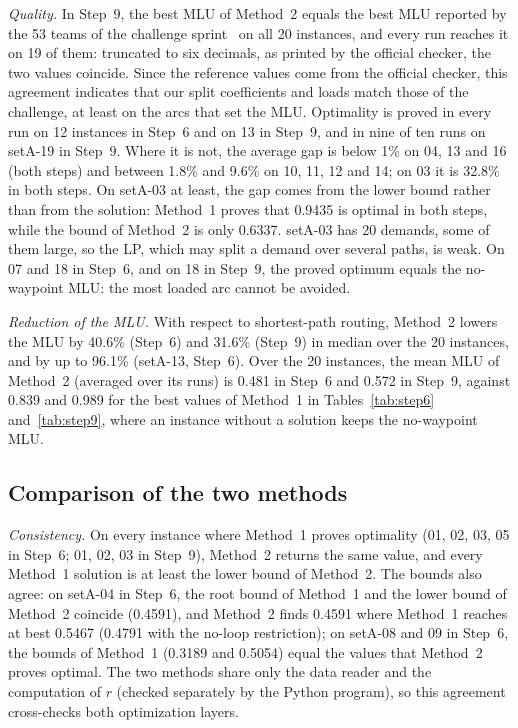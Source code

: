 \documentclass[conference]{IEEEtran}
\begin{document}
\emph{Quality.} In Step~9, the best MLU of Method~2 equals the best MLU reported by the 53 teams of the challenge sprint~\cite{roadefrepo} on all 20 instances, and every run reaches it on 19 of them: truncated to six decimals, as printed by the official checker, the two values coincide. Since the reference values come from the official checker, this agreement indicates that our split coefficients and loads match those of the challenge, at least on the arcs that set the MLU. Optimality is proved in every run on 12 instances in Step~6 and on 13 in Step~9, and in nine of ten runs on setA-19 in Step~9. Where it is not, the average gap is below 1\% on 04, 13 and 16 (both steps) and between 1.8\% and 9.6\% on 10, 11, 12 and 14; on 03 it is 32.8\% in both steps. On setA-03 at least, the gap comes from the lower bound rather than from the solution: Method~1 proves that 0.9435 is optimal in both steps, while the bound of Method~2 is only 0.6337. setA-03 has 20 demands, some of them large, so the LP, which may split a demand over several paths, is weak. On 07 and 18 in Step~6, and on 18 in Step~9, the proved optimum equals the no-waypoint MLU: the most loaded arc cannot be avoided.

\emph{Reduction of the MLU.} With respect to shortest-path routing, Method~2 lowers the MLU by 40.6\% (Step~6) and 31.6\% (Step~9) in median over the 20 instances, and by up to 96.1\% (setA-13, Step~6). Over the 20 instances, the mean MLU of Method~2 (averaged over its runs) is 0.481 in Step~6 and 0.572 in Step~9, against 0.839 and 0.989 for the best values of Method~1 in Tables~\ref{tab:step6} and~\ref{tab:step9}, where an instance without a solution keeps the no-waypoint MLU.

\subsection{Comparison of the two methods}\label{sec:compare}
\emph{Consistency.} On every instance where Method~1 proves optimality (01, 02, 03, 05 in Step~6; 01, 02, 03 in Step~9), Method~2 returns the same value, and every Method~1 solution is at least the lower bound of Method~2. The bounds also agree: on setA-04 in Step~6, the root bound of Method~1 and the lower bound of Method~2 coincide (0.4591), and Method~2 finds 0.4591 where Method~1 reaches at best 0.5467 (0.4791 with the no-loop restriction); on setA-08 and 09 in Step~6, the bounds of Method~1 (0.3189 and 0.5054) equal the values that Method~2 proves optimal. The two methods share only the data reader and the computation of $r$ (checked separately by the Python program), so this agreement cross-checks both optimization layers.
\end{document}
